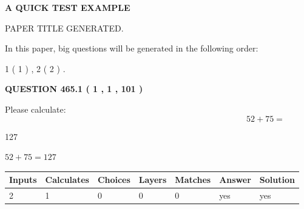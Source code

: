 \documentclass[12pt]{article}
\begin{document}
   
   
   
   
   
 \vspace{0.2in}
{\LARGE {\textbf{ A QUICK TEST EXAMPLE}}}
   
   
 PAPER TITLE GENERATED.
   
   
   
\vspace{0.2in}
   
In this paper, big questions will be generated in the following order: 
   
   
   1 ( 1 )
 ,
   2 ( 2 )
 .
  
\vspace{0.2in}
  
{\textbf{\Large{QUESTION
465.1 
 ( 1 , 1 , 101 )
}}}
  
  
 
Please calculate:
\begin{equation}
52 +  %
75 = \nonumber
\end{equation}
 
 
 
\noindent{}
 
 

127
 
 
\noindent{}
 
 

 
 
 
\noindent{}
 
 

$ %
52 +  %
75=   %
127$
 
 
\noindent{}
 
 

 
   
   
   
   
\noindent\begin{tabular}{|l|l|l|l|l|l|l|}
 \hline
Inputs & Calculates & Choices & Layers & Matches & Answer & Solution \\ \hline
 2  & 
 1  & 
 0
  & 
 0  & 
 0  & 
  yes & 
  yes 
  \\ \hline
 \end{tabular}
   
   
   
\end{document}
